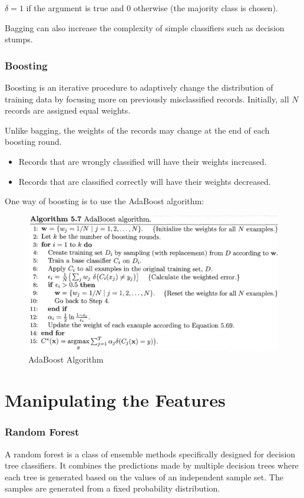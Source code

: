 $\delta = 1$ if the argument is true and $0$ otherwise (the majority class is chosen).

Bagging can also increase the complexity of simple classifiers such as decision stumps.

\newpage
\subsubsection{Boosting}
Boosting is an iterative procedure to adaptively change the distribution of training data by focusing more on previously misclassified records.
Initially, all $N$ records are assigned equal weights.

Unlike bagging, the weights of the records may change at the end of each boosting round.

\begin{itemize}
    \item Records that are wrongly classified will have their weights increased.
    \item Records that are classified correctly will have their weights decreased.
\end{itemize}

One way of boosting is to use the AdaBoost algorithm:

\begin{figure}[H]
    \centering
    \includegraphics[scale=0.3]{figures/adaboost.png}
    \caption{AdaBoost Algorithm}
\end{figure}

\newpage
\section{Manipulating the Features}
\subsubsection{Random Forest}
A random forest is a class of ensemble methods specifically designed for decision tree classifiers.
It combines the predictions made by multiple decision trees where each tree is generated based on the values of an independent sample set.
The samples are generated from a fixed probability distribution.

